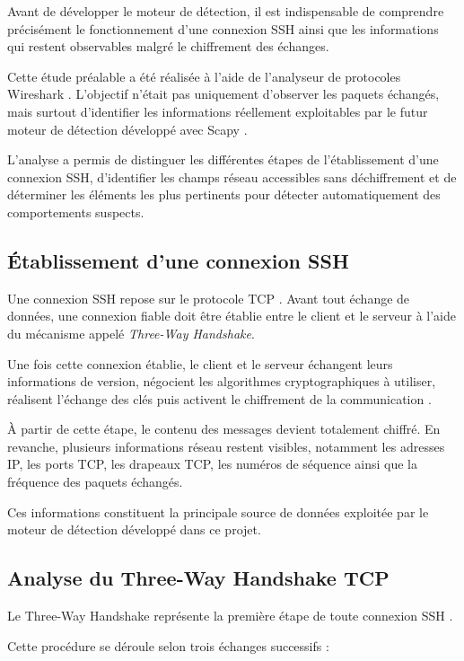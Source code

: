 Avant de développer le moteur de détection, il est indispensable de comprendre précisément le fonctionnement d'une connexion SSH ainsi que les informations qui restent observables malgré le chiffrement des échanges.

Cette étude préalable a été réalisée à l'aide de l'analyseur de protocoles Wireshark \cite{wireshark_docs}. L'objectif n'était pas uniquement d'observer les paquets échangés, mais surtout d'identifier les informations réellement exploitables par le futur moteur de détection développé avec Scapy \cite{scapy_docs}.

L'analyse a permis de distinguer les différentes étapes de l'établissement d'une connexion SSH, d'identifier les champs réseau accessibles sans déchiffrement et de déterminer les éléments les plus pertinents pour détecter automatiquement des comportements suspects.

\subsection{Établissement d'une connexion SSH}

Une connexion SSH repose sur le protocole TCP \cite{rfc4253,rfc793}. Avant tout échange de données, une connexion fiable doit être établie entre le client et le serveur à l'aide du mécanisme appelé \textit{Three-Way Handshake}.

Une fois cette connexion établie, le client et le serveur échangent leurs informations de version, négocient les algorithmes cryptographiques à utiliser, réalisent l'échange des clés puis activent le chiffrement de la communication \cite{rfc4253}.

À partir de cette étape, le contenu des messages devient totalement chiffré. En revanche, plusieurs informations réseau restent visibles, notamment les adresses IP, les ports TCP, les drapeaux TCP, les numéros de séquence ainsi que la fréquence des paquets échangés.

Ces informations constituent la principale source de données exploitée par le moteur de détection développé dans ce projet.

\subsection{Analyse du Three-Way Handshake TCP}

Le Three-Way Handshake représente la première étape de toute connexion SSH \cite{rfc793}.

Cette procédure se déroule selon trois échanges successifs :

